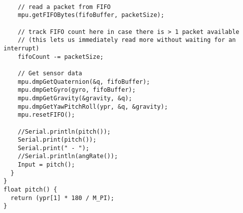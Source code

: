 \begin{lstlisting}
 
    // read a packet from FIFO
    mpu.getFIFOBytes(fifoBuffer, packetSize);
 
    // track FIFO count here in case there is > 1 packet available
    // (this lets us immediately read more without waiting for an interrupt)
    fifoCount -= packetSize;
 
    // Get sensor data
    mpu.dmpGetQuaternion(&q, fifoBuffer);
    mpu.dmpGetGyro(gyro, fifoBuffer);
    mpu.dmpGetGravity(&gravity, &q);
    mpu.dmpGetYawPitchRoll(ypr, &q, &gravity);
    mpu.resetFIFO();
 
    //Serial.println(pitch());
    Serial.print(pitch());
    Serial.print(" - ");
    //Serial.println(angRate());
    Input = pitch();
  }
}
float pitch() {
  return (ypr[1] * 180 / M_PI);
}
\end{lstlisting}